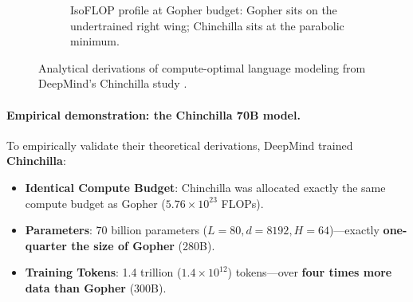 \documentclass[../../main.tex]{subfiles}
\begin{document}
\begin{figure}[htbp]
\begin{subfigure}[b]{0.48\textwidth}
{%
}
\caption{IsoFLOP profile at Gopher budget: Gopher sits on the undertrained right wing; Chinchilla sits at the parabolic minimum.}
\label{fig:isoflop_curves}
\end{subfigure}
\caption{Analytical derivations of compute-optimal language modeling from DeepMind's Chinchilla study \cite{hoffmann2022}.}
\label{fig:chinchilla_analytical_visualizations}
\end{figure}

\paragraph{Empirical demonstration: the Chinchilla 70B model.}
To empirically validate their theoretical derivations, DeepMind trained \textbf{Chinchilla}:
\begin{itemize}
    \item \textbf{Identical Compute Budget}: Chinchilla was allocated exactly the same compute budget as Gopher ($5.76 \times 10^{23}$ FLOPs).
    \item \textbf{Parameters}: 70 billion parameters ($L = 80, d = 8192, H = 64$)---exactly \textbf{one-quarter the size of Gopher} (280B).
    \item \textbf{Training Tokens}: 1.4 trillion ($1.4 \times 10^{12}$) tokens---over \textbf{four times more data than Gopher} (300B).
\end{itemize}
\end{document}
